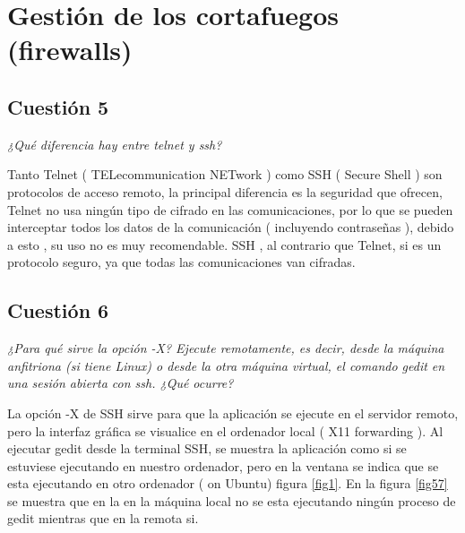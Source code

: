 \section{Gestión de los cortafuegos (firewalls)}
\subsection{Cuestión 5}
\textit{¿Qué diferencia hay entre telnet y ssh?}
\newline

Tanto Telnet ( TELecommunication NETwork ) como SSH ( Secure Shell ) son protocolos de acceso remoto, la principal diferencia es la seguridad que ofrecen, Telnet no usa ningún tipo de cifrado en las comunicaciones, por lo que se pueden interceptar todos los datos de la comunicación ( incluyendo contraseñas ), debido a esto , su uso no es muy recomendable. SSH , al contrario que Telnet, si es un protocolo seguro, ya que todas las comunicaciones van cifradas. \cite{sshtle}





\subsection{Cuestión 6}
\textit{¿Para qué sirve la opción -X? Ejecute remotamente, es decir, desde la máquina anfitriona (si tiene Linux) o desde la otra máquina virtual, el comando gedit en una sesión abierta con ssh. ¿Qué ocurre?}
\newline

La opción -X de SSH sirve para que la aplicación se ejecute en el servidor remoto, pero la interfaz gráfica se visualice en el ordenador local ( X11 forwarding ). \cite{sshx} Al ejecutar gedit desde la terminal SSH, se muestra la aplicación como si se estuviese ejecutando en nuestro ordenador, pero en la ventana se indica que se esta ejecutando en otro ordenador ( on Ubuntu) figura \ref{fig1}. En la figura \ref{fig57} se muestra que en la en la máquina local no se esta ejecutando ningún proceso de gedit mientras que en la remota si.


